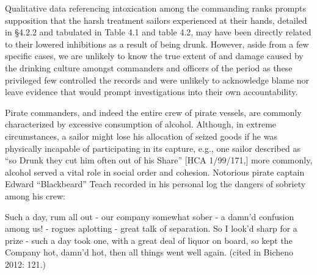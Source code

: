\begin{styleStandard}
Qualitative data referencing intoxication among the commanding ranks prompts supposition that the harsh treatment sailors experienced at their hands, detailed in §4.2.2 and tabulated in Table 4.1 and table 4.2, may have been directly related to their lowered inhibitions as a result of being drunk. However, aside from a few specific cases, we are unlikely to know the true extent of and damage caused by the drinking culture amongst commanders and officers of the period as these privileged few controlled the records and were unlikely to acknowledge blame nor leave evidence that would prompt investigations into their own accountability.
\end{styleStandard}

\begin{styleStandard}
Pirate commanders, and indeed the entire crew of pirate vessels, are commonly characterized by excessive consumption of alcohol. Although, in extreme circumstances, a sailor might lose his allocation of seized goods if he was physically incapable of participating in its capture, e.g., one sailor described as “so Drunk they cut him often out of his Share” [HCA 1/99/171,] more commonly, alcohol served a vital role in social order and cohesion. Notorious pirate captain Edward “Blackbeard” Teach recorded in his personal log the dangers of sobriety among his crew:
\end{styleStandard}

\begin{styleStandard}
Such a day, rum all out - our company somewhat sober - a damn’d confusion among us! - rogues aplotting - great talk of separation. So I look’d sharp for a prize - such a day took one, with a great deal of liquor on board, so kept the Company hot, damn’d hot, then all things went well again. (cited in Bicheno 2012: 121.) 
\end{styleStandard}

